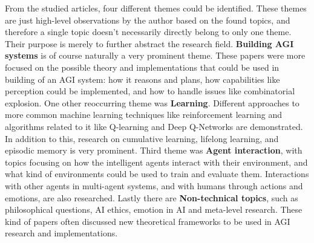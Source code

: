 \documentclass[utf8,english]{gradu3}
\begin{document}
From the studied articles, four different themes could be identified. These
themes are just high-level observations by the author based on the found topics,
and therefore a single topic doesn't necessarily directly belong to only one
theme. Their purpose is merely to further abstract the research field.
\textbf{Building AGI systems} is of course naturally a very prominent theme.
These papers were more focused on the possible theory and implementations that
could be used in building of an AGI system: how it reasons and plans, how
capabilities like perception could be implemented, and how to handle issues like
combinatorial explosion. One other reoccurring theme was \textbf{Learning}.
Different approaches to more common machine learning techniques like
reinforcement learning and algorithms related to it like Q-learning and Deep
Q-Networks are demonstrated. In addition to this, research on cumulative
learning, lifelong learning, and episodic memory is very prominent. Third theme
was \textbf{Agent interaction}, with topics focusing on how the intelligent
agents interact with their environment, and what kind of environments could be
used to train and evaluate them. Interactions with other agents in multi-agent
systems, and with humans through actions and emotions, are also researched.
Lastly there are \textbf{Non-technical topics}, such as philosophical questions,
AI ethics, emotion in AI and meta-level research. These kind of papers often
discussed new theoretical frameworks to be used in AGI research and
implementations. 
\end{document}
